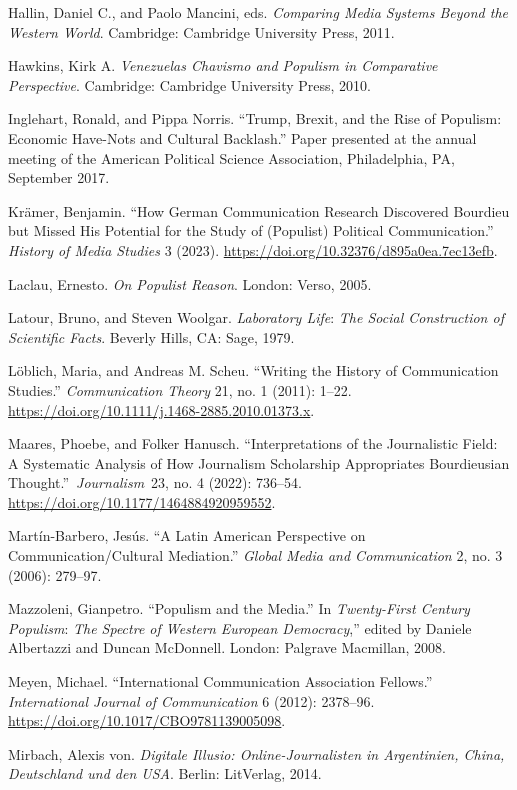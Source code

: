 \documentclass{tufte-handout}
\begin{document}
{{{{\begin{hangparas}{.25in}{1}
Hallin, Daniel C., and Paolo Mancini, eds. \emph{Comparing Media Systems
Beyond the Western World}. Cambridge: Cambridge University Press, 2011.

Hawkins, Kirk A. \emph{Venezuela\textquotesingle s Chavismo and Populism
in Comparative Perspective}. Cambridge: Cambridge University Press,
2010.

Inglehart, Ronald, and Pippa Norris. ``Trump, Brexit, and the Rise of
Populism: Economic Have-Nots and Cultural Backlash.'' Paper presented at
the annual meeting of the American Political Science Association,
Philadelphia, PA, September 2017.

Krämer, Benjamin. ``How German Communication Research Discovered
Bourdieu but Missed His Potential for the Study of (Populist) Political
Communication.'' \emph{History of Media Studies} 3 (2023).
\url{https://doi.org/10.32376/d895a0ea.7ec13efb}.

Laclau, Ernesto. \emph{On Populist Reason}. London: Verso, 2005.

Latour, Bruno, and Steven Woolgar. \emph{Laboratory Life}: \emph{The
Social Construction of Scientific Facts}. Beverly Hills, CA: Sage, 1979.

Löblich, Maria, and Andreas M. Scheu. ``Writing the History of
Communication Studies.'' \emph{Communication Theory} 21, no. 1 (2011):
1--22. \url{https://doi.org/10.1111/j.1468-2885.2010.01373.x}.

Maares, Phoebe, and Folker Hanusch. ``Interpretations of the
Journalistic Field: A Systematic Analysis of How Journalism Scholarship
Appropriates Bourdieusian Thought.''~\emph{Journalism}~23, no. 4 (2022):
736--54. \url{https://doi.org/10.1177/1464884920959552}.

Martín-Barbero, Jesús. ``A Latin American Perspective on
Communication/Cultural Mediation.'' \emph{Global Media and
Communication} 2, no. 3 (2006): 279--97.

Mazzoleni, Gianpetro. ``Populism and the Media.'' In \emph{Twenty-First
Century Populism}: \emph{The Spectre of Western European Democracy},''
edited by Daniele Albertazzi and Duncan McDonnell. London: Palgrave
Macmillan, 2008.

Meyen, Michael. ``International Communication Association Fellows.''
\emph{International Journal of Communication} 6 (2012): 2378--96.
\url{https://doi.org/10.1017/CBO9781139005098}.

Mirbach, Alexis von. \emph{Digitale Illusio: Online-Journalisten in
Argentinien, China, Deutschland und den USA}. Berlin: LitVerlag, 2014.


\end{hangparas}}}}}
\end{document}
